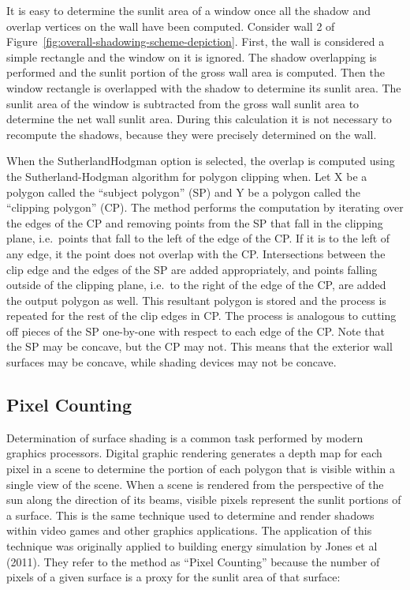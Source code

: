 It is easy to determine the sunlit area of a window once all the shadow and overlap vertices on the wall have been computed. Consider wall 2 of Figure~\ref{fig:overall-shadowing-scheme-depiction}. First, the wall is considered a simple rectangle and the window on it is ignored. The shadow overlapping is performed and the sunlit portion of the gross wall area is computed. Then the window rectangle is overlapped with the shadow to determine its sunlit area. The sunlit area of the window is subtracted from the gross wall sunlit area to determine the net wall sunlit area. During this calculation it is not necessary to recompute the shadows, because they were precisely determined on the wall.

When the SutherlandHodgman option is selected, the overlap is computed using the Sutherland-Hodgman algorithm for polygon clipping when. Let X be a polygon called the ``subject polygon'' (SP) and Y be a polygon called the ``clipping polygon'' (CP). The method performs the computation by iterating over the edges of the CP and removing points from the SP that fall in the clipping plane, i.e.~points that fall to the left of the edge of the CP. If it is to the left of any edge, it the point does not overlap with the CP. Intersections between the clip edge and the edges of the SP are added appropriately, and points falling outside of the clipping plane, i.e.~to the right of the edge of the CP, are added the output polygon as well. This resultant polygon is stored and the process is repeated for the rest of the clip edges in CP. The process is analogous to cutting off pieces of the SP one-by-one with respect to each edge of the CP. Note that the SP may be concave, but the CP may not. This means that the exterior wall surfaces may be concave, while shading devices may not be concave.

\subsection{Pixel Counting}

Determination of surface shading is a common task performed by modern graphics processors. Digital graphic rendering generates a depth map for each pixel in a scene to determine the portion of each polygon that is visible within a single view of the scene. When a scene is rendered from the perspective of the sun along the direction of its beams, visible pixels represent the sunlit portions of a surface. This is the same technique used to determine and render shadows within video games and other graphics applications. The application of this technique was originally applied to building energy simulation by Jones et al (2011). They refer to the method as ``Pixel Counting'' because the number of pixels of a given surface is a proxy for the sunlit area of that surface:

